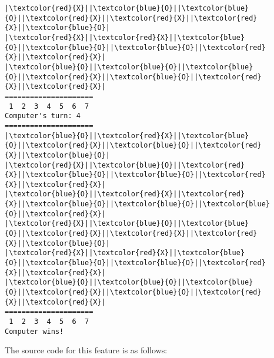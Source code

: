 \documentclass{article}
\begin{document}
\begin{Verbatim}[commandchars=\\\{\}]
|\textcolor{red}{X}||\textcolor{blue}{O}||\textcolor{blue}{O}||\textcolor{red}{X}||\textcolor{red}{X}||\textcolor{red}{X}||\textcolor{blue}{O}|
|\textcolor{red}{X}||\textcolor{red}{X}||\textcolor{blue}{O}||\textcolor{blue}{O}||\textcolor{blue}{O}||\textcolor{red}{X}||\textcolor{red}{X}|
|\textcolor{blue}{O}||\textcolor{blue}{O}||\textcolor{blue}{O}||\textcolor{red}{X}||\textcolor{blue}{O}||\textcolor{red}{X}||\textcolor{red}{X}|
=====================
 1  2  3  4  5  6  7
Computer's turn: 4
=====================
|\textcolor{blue}{O}||\textcolor{red}{X}||\textcolor{blue}{O}||\textcolor{red}{X}||\textcolor{blue}{O}||\textcolor{red}{X}||\textcolor{blue}{O}|
|\textcolor{red}{X}||\textcolor{blue}{O}||\textcolor{red}{X}||\textcolor{blue}{O}||\textcolor{blue}{O}||\textcolor{red}{X}||\textcolor{red}{X}|
|\textcolor{blue}{O}||\textcolor{red}{X}||\textcolor{red}{X}||\textcolor{blue}{O}||\textcolor{blue}{O}||\textcolor{blue}{O}||\textcolor{red}{X}|
|\textcolor{red}{X}||\textcolor{blue}{O}||\textcolor{blue}{O}||\textcolor{red}{X}||\textcolor{red}{X}||\textcolor{red}{X}||\textcolor{blue}{O}|
|\textcolor{red}{X}||\textcolor{red}{X}||\textcolor{blue}{O}||\textcolor{blue}{O}||\textcolor{blue}{O}||\textcolor{red}{X}||\textcolor{red}{X}|
|\textcolor{blue}{O}||\textcolor{blue}{O}||\textcolor{blue}{O}||\textcolor{red}{X}||\textcolor{blue}{O}||\textcolor{red}{X}||\textcolor{red}{X}|
=====================
 1  2  3  4  5  6  7
Computer wins!
\end{Verbatim}
The source code for this feature is as follows:
\end{document}
